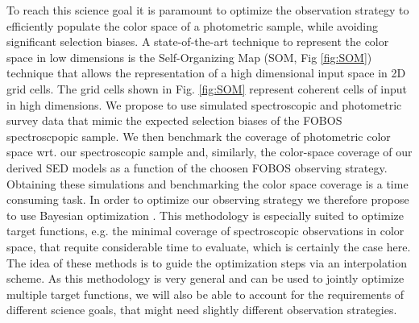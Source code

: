 \documentclass[oneside,11pt]{amsart}
\begin{document}
{\color{magenta} To reach this science goal it is paramount to optimize the observation strategy to efficiently populate the color space of a photometric sample, while avoiding significant selection biases. 
A state-of-the-art technique to represent the color space in low dimensions is the Self-Organizing Map (SOM, Fig \ref {fig:SOM}) technique that allows the representation of a high dimensional input space in 2D grid cells. The grid cells shown in Fig. \ref{fig:SOM} represent coherent cells of input in high dimensions. We propose to use simulated spectroscopic and photometric survey data that mimic the expected selection biases of the FOBOS spectroscpopic sample. We then benchmark the coverage of photometric color space wrt. our spectroscopic sample and, similarly, the color-space coverage of our derived SED models as a function of the choosen FOBOS observing strategy. Obtaining these simulations and benchmarking the color space coverage is a time consuming task. In order to optimize our observing strategy we therefore propose to use Bayesian optimization \citep[see e.g.][]{2017arXiv170306240K,2018arXiv180512168P,  2019arXiv190111515N}. 
This methodology is especially suited to optimize target functions, e.g. the minimal coverage of spectroscopic observations in color space, that requite considerable time to evaluate, which is certainly the case here. The idea of these methods is to guide the optimization steps via an interpolation scheme. 
As this methodology is very general and can be used to jointly optimize multiple target functions, we will also be able to account for the requirements of different science goals, that might need slightly different observation strategies. 
}


\end{document}
